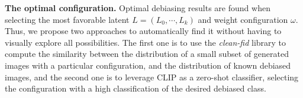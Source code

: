 \noindent\textbf{The optimal configuration.} Optimal debiasing results are found when selecting the most favorable latent $L = (L_{0}, \cdots, L_{k})$ and weight configuration $\omega$. Thus, we propose two approaches to automatically find it without having to visually explore all possibilities. The first one is to use the \textit{clean-fid} \cite{parmar2022aliased} library to compute the similarity between the distribution of a small subset of generated images with a particular configuration, and the distribution of known debiased images, and the second one is to leverage CLIP \cite{radford2021learning} as a zero-shot classifier, selecting the configuration with a high classification of the desired debiased class. 
